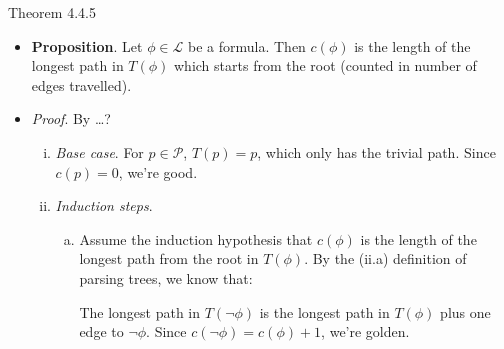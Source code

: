 \begin{frame}{Theorem 4.4.5}

	\begin{itemize}
	
		\item \textbf{Proposition}. Let $\phi\in\mathcal{L}$ be a formula. Then $c(\phi)$ is the length of the longest path in $T(\phi)$ which starts from the root (counted in number of edges travelled).
		
		\item \emph{Proof}. By \dots ?
		
		\begin{enumerate}[(i)]
		
			\item \emph{Base case}. For $p\in\mathcal{P}$, $T(p)=p$, which only has the trivial path. Since $c(p)=0$, we're good.
			
			\item \emph{Induction steps}. 
				\begin{enumerate}[(a)]

					\item Assume the induction hypothesis that $c(\phi)$ is the length of the longest path from the root in $T(\phi)$. By the (ii.a) definition of parsing trees, we know that:
					\begin{center}
\end{center}
The longest path in $T(\neg\phi)$ is the longest path in $T(\phi)$ plus one edge to $\neg\phi$. Since $c(\neg\phi)=c(\phi)+1$, we're golden.
		
		\end{enumerate}
		
		\end{enumerate}
	
	\end{itemize}

\end{frame}
